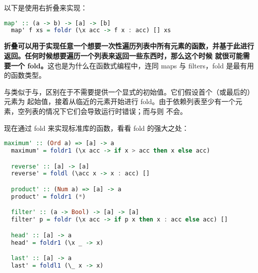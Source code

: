 \documentclass[./main.tex]{subfiles}
\begin{document}
以下是使用右折叠来实现：

\begin{lstlisting}[language=Haskell]
  map' :: (a -> b) -> [a] -> [b]
  map' f xs = foldr (\x acc -> f x : acc) [] xs
\end{lstlisting}

\textbf{折叠可以用于实现任意一个想要一次性遍历列表中所有元素的函数，并基于此进行返回。任何时候想要遍历一个列表来返回一些东西时，那么这个时候
  就很可能需要一个 fold。}这也是为什么在函数式编程中，连同 maps 与 filters，fold 是最有用的函数类型。

与类似于与，区别在于不需要提供一个显式的初始值。它们假设首个（或最后的）元素为
起始值，接着从临近的元素开始进行 fold。由于依赖列表至少有一个元素，空列表的情况下它们会导致运行时错误；而与则
不会。

现在通过 fold 来实现标准库的函数，看看 fold 的强大之处：

\begin{lstlisting}[language=Haskell]
  maximum' :: (Ord a) => [a] -> a
  maximum' = foldr1 (\x acc -> if x > acc then x else acc)

  reverse' :: [a] -> [a]
  reverse' = foldl (\acc x -> x : acc) []

  product' :: (Num a) => [a] -> a
  product' = foldr1 (*)

  filter' :: (a -> Bool) -> [a] -> [a]
  filter' p = foldr (\x acc -> if p x then x : acc else acc) []

  head' :: [a] -> a
  head' = foldr1 (\x _ -> x)

  last' :: [a] -> a
  last' = foldl1 (\_ x -> x)
\end{lstlisting}


\begin{lstlisting}[language=Haskell]

\end{lstlisting}
\end{document}
